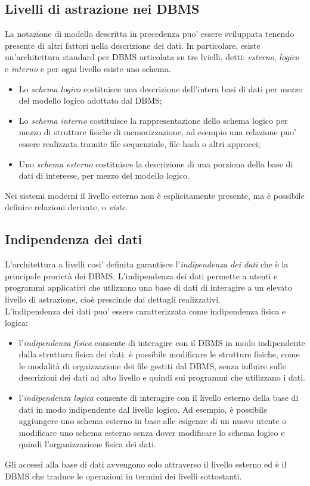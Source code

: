 \documentclass[12pt]{report}
\begin{document}
			\subsection{Livelli di astrazione nei DBMS}
			La notazione di modello descritta in precedenza puo' essere sviluppata tenendo presente di altri fattori nella descrizione dei dati. In particolare, esiste un'architettura standard per DBMS articolata su tre lvielli, detti: \textit{esterno}, \textit{logico} e \textit{interno} e per ogni livello esiste uno schema.
			\begin{itemize}
				\item Lo \textit{schema logico} costituisce una descrizione dell'intera basi di dati per mezzo del modello logico adottato dal DBMS;
				\item Lo \textit{schema interno} costituisce la rappresentazione dello schema logico per mezzo di strutture fisiche di memorizzazione, ad esempio una relazione puo' essere realizzata tramite file sequenziale, file hash o altri approcci;
				\item Uno \textit{schema esterno} costituisce la descrizione di una porziona della base di dati di interesse, per mezzo del modello logico.
			\end{itemize}
			Nei sistemi moderni il livello esterno non è esplicitamente presente, ma è possibile definire relazioni derivate, o \textit{viste}.
			\subsection{Indipendenza dei dati}
			L'architettura a livelli cosi' definita garantisce l'\textit{indipendenza dei dati} che è la principale prorietà dei DBMS. L'indipendenza dei dati permette a utenti e programmi applicativi che utlizzano una base di dati di interagire a un elevato livello di astrazione, cioè prescinde dai dettagli realizzativi. \\
			L'indipendenza dei dati puo' essere caratterizzata come indipendenza fisica e logica:
			\begin{itemize}
				\item l'\textit{indipendenza fisica} consente di interagire con il DBMS in modo indipendente dalla struttura fisica dei dati. è possibile modificare le strutture fisiche, come le modalità di orgaizzazione dei file gestiti dal DBMS, senza influire sulle descrizioni dei dati ad alto livello e quindi sui programmi che utilizzano i dati.
				\item l'\textit{indipendenza logica} consente di interagire con il livello esterno della base di dati in modo indipendente dal livello logico. Ad esempio, è possibile aggiungere uno schema esterno in base alle esigenze di un nuovo utente o modificare uno schema esterno senza dover modificare lo schema logico e quindi l'organizzazione fisica dei dati.
			\end{itemize}
			Gli accessi alla base di dati avvengono solo attraverso il livello esterno ed è il DBMS che traduce le operazioni in termini dei livelli sottostanti.
\end{document}
